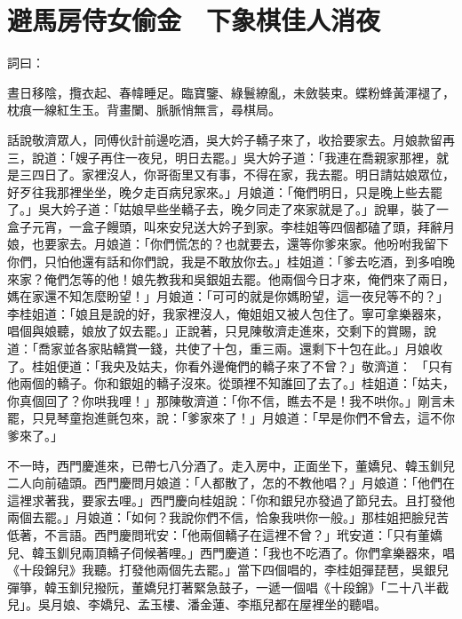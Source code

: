 %

\chapter{避馬房侍女偷金　下象棋佳人消夜}

詞曰：

晝日移陰，攬衣起、春幃睡足。臨寶鑒、綠鬟繚亂，未斂裝束。蝶粉蜂黃渾褪了，枕痕一線紅生玉。背畫闌、脈脈悄無言，尋棋局。

話說敬濟眾人，同傅伙計前邊吃酒，吳大妗子轎子來了，收拾要家去。月娘款留再三，說道：「嫂子再住一夜兒，明日去罷。」吳大妗子道：「我連在喬親家那裡，就是三四日了。家裡沒人，你哥衙里又有事，不得在家，我去罷。明日請姑娘眾位，好歹往我那裡坐坐，晚夕走百病兒家來。」月娘道：「俺們明日，只是晚上些去罷了。」吳大妗子道：「姑娘早些坐轎子去，晚夕同走了來家就是了。」說畢，裝了一盒子元宵，一盒子饅頭，叫來安兒送大妗子到家。李桂姐等四個都磕了頭，拜辭月娘，也要家去。月娘道：「你們慌怎的？也就要去，還等你爹來家。他吩咐我留下你們，只怕他還有話和你們說，我是不敢放你去。」桂姐道：「爹去吃酒，到多咱晚來家？俺們怎等的他！娘先教我和吳銀姐去罷。他兩個今日才來，俺們來了兩日，媽在家還不知怎麼盼望！」月娘道：「可可的就是你媽盼望，這一夜兒等不的？」李桂姐道：「娘且是說的好，我家裡沒人，俺姐姐又被人包住了。寧可拿樂器來，唱個與娘聽，娘放了奴去罷。」正說著，只見陳敬濟走進來，交剩下的賞賜，說道：「喬家並各家貼轎賞一錢，共使了十包，重三兩。還剩下十包在此。」月娘收了。桂姐便道：「我央及姑夫，你看外邊俺們的轎子來了不曾？」敬濟道： 「只有他兩個的轎子。你和銀姐的轎子沒來。從頭裡不知誰回了去了。」桂姐道：「姑夫，你真個回了？你哄我哩！」那陳敬濟道：「你不信，瞧去不是！我不哄你。」剛言未罷，只見琴童抱進氈包來，說：「爹家來了！」月娘道：「早是你們不曾去，這不你爹來了。」

不一時，西門慶進來，已帶七八分酒了。走入房中，正面坐下，董嬌兒、韓玉釧兒二人向前磕頭。西門慶問月娘道：「人都散了，怎的不教他唱？」月娘道：「他們在這裡求著我，要家去哩。」西門慶向桂姐說：「你和銀兒亦發過了節兒去。且打發他兩個去罷。」月娘道：「如何？我說你們不信，恰象我哄你一般。」那桂姐把臉兒苦低著，不言語。西門慶問玳安：「他兩個轎子在這裡不曾？」玳安道：「只有董嬌兒、韓玉釧兒兩頂轎子伺候著哩。」西門慶道：「我也不吃酒了。你們拿樂器來，唱《十段錦兒》我聽。打發他兩個先去罷。」當下四個唱的，李桂姐彈琵琶，吳銀兒彈箏，韓玉釧兒撥阮，董嬌兒打著緊急鼓子，一遞一個唱《十段錦》「二十八半截兒」。吳月娘、李嬌兒、孟玉樓、潘金蓮、李瓶兒都在屋裡坐的聽唱。

